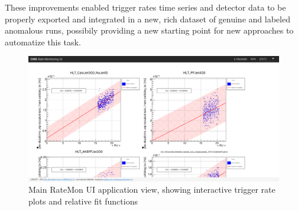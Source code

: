 \documentclass[a4, oneside, 11pt, nobib]{memoir}
\begin{document}
		These improvements enabled trigger rates time series and detector data to be properly exported and integrated in a new, rich dataset of genuine and labeled anomalous runs, possibily providing a new starting point for new approaches to automatize this task.

\begin{figure}[H]
    \centerline{
        \includegraphics[width=0.9\paperwidth]{figures/ratemon-ui0.png}}
    \caption{Main RateMon UI application view, showing interactive trigger rate plots and relative fit functions}
    \label{fig:ratemon_ui0}
\end{figure}
 
\printbibliography
\thispagestyle{empty}
\end{document}
